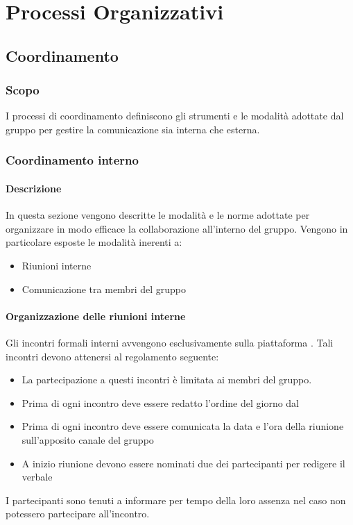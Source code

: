 \section{Processi Organizzativi}
\subsection{Coordinamento}
\subsubsection{Scopo}
I processi di coordinamento definiscono gli strumenti e le modalità adottate dal gruppo per gestire la comunicazione sia interna che esterna.
\subsubsection{Coordinamento interno}
\paragraph{Descrizione}
In questa sezione vengono descritte le modalità e le norme adottate per organizzare in modo efficace la collaborazione all'interno del gruppo. 
Vengono in particolare esposte le modalità inerenti a:
\begin{itemize}
\item Riunioni interne
\item Comunicazione tra membri del gruppo
\end{itemize}
\paragraph{Organizzazione delle riunioni interne}
Gli incontri formali interni avvengono esclusivamente sulla piattaforma .
Tali incontri devono attenersi al regolamento seguente:
\begin{itemize}
\item La partecipazione a questi incontri è limitata ai membri del gruppo.
\item Prima di ogni incontro deve essere redatto l'ordine del giorno dal \RdP{}
\item Prima di ogni incontro deve essere comunicata la data e l'ora della riunione sull'apposito canale  del gruppo
\item A inizio riunione devono essere nominati due dei partecipanti per redigere il verbale
\end{itemize}
I partecipanti sono tenuti a informare per tempo della loro assenza nel caso non potessero partecipare all'incontro.
